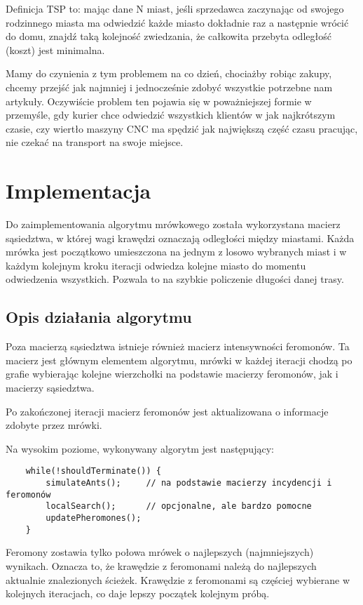 \documentclass{article}
\begin{document}
Definicja TSP to: mając dane N miast, jeśli sprzedawca zaczynając od swojego
rodzinnego miasta ma odwiedzić każde miasto dokładnie raz a następnie wrócić do
domu, znajdź taką kolejność zwiedzania, że całkowita przebyta odległość (koszt)
jest minimalna.\cite{IACSIT, Jishou}

Mamy do czynienia z tym problemem na co dzień, chociażby robiąc zakupy, chcemy
przejść jak najmniej i jednocześnie zdobyć wszystkie potrzebne nam artykuły.
Oczywiście problem ten pojawia się w poważniejszej formie w przemyśle,
gdy kurier chce odwiedzić wszystkich klientów w jak najkrótszym czasie, czy
wiertło maszyny CNC ma spędzić jak największą część czasu pracując, nie czekać
na transport na swoje miejsce.

\section{Implementacja}
Do zaimplementowania algorytmu mrówkowego została wykorzystana macierz
sąsiedztwa, w której wagi krawędzi oznaczają odległości między miastami. Każda
mrówka jest początkowo umieszczona na jednym z losowo wybranych miast i w każdym
kolejnym kroku iteracji odwiedza kolejne miasto do momentu odwiedzenia
wszystkich. Pozwala to na szybkie policzenie długości danej trasy.

\subsection*{Opis działania algorytmu}
Poza macierzą sąsiedztwa istnieje również macierz intensywności feromonów.  Ta
macierz jest głównym elementem algorytmu, mrówki w każdej iteracji chodzą po
grafie wybierając kolejne wierzchołki na podstawie macierzy feromonów, jak i
macierzy sąsiedztwa.

Po zakończonej iteracji macierz feromonów jest aktualizowana o informacje
zdobyte przez mrówki.

Na wysokim poziome, wykonywany algorytm jest następujący:
\begin{verbatim}
    while(!shouldTerminate()) {
        simulateAnts();     // na podstawie macierzy incydencji i feromonów
        localSearch();      // opcjonalne, ale bardzo pomocne
        updatePheromones();
    }
\end{verbatim}

Feromony zostawia tylko połowa mrówek o najlepszych (najmniejszych) wynikach.
Oznacza to, że krawędzie z feromonami należą do najlepszych aktualnie
znalezionych ścieżek. Krawędzie z feromonami są częściej wybierane w kolejnych
iteracjach, co daje lepszy początek kolejnym próbą.
\end{document}
